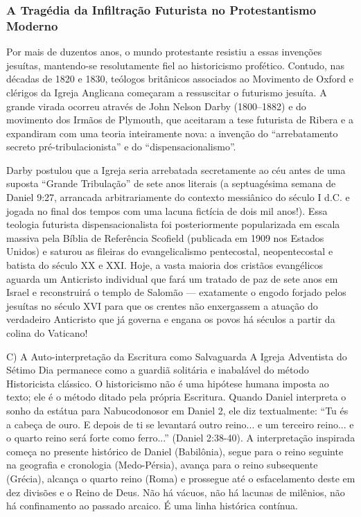 \subsubsection*{A Tragédia da Infiltração Futurista no Protestantismo Moderno}
Por mais de duzentos anos, o mundo protestante resistiu a essas invenções jesuítas, mantendo-se resolutamente fiel ao historicismo profético. Contudo, nas décadas de 1820 e 1830, teólogos britânicos associados ao Movimento de Oxford e clérigos da Igreja Anglicana começaram a ressuscitar o futurismo jesuíta. A grande virada ocorreu através de John Nelson Darby (1800–1882) e do movimento dos Irmãos de Plymouth, que aceitaram a tese futurista de Ribera e a expandiram com uma teoria inteiramente nova: a invenção do ``arrebatamento secreto pré-tribulacionista'' e do ``dispensacionalismo''.

Darby postulou que a Igreja seria arrebatada secretamente ao céu antes de uma suposta ``Grande Tribulação'' de sete anos literais (a septuagésima semana de Daniel 9:27, arrancada arbitrariamente do contexto messiânico do século I d.C. e jogada no final dos tempos com uma lacuna fictícia de dois mil anos!). Essa teologia futurista dispensacionalista foi posteriormente popularizada em escala massiva pela Bíblia de Referência Scofield (publicada em 1909 nos Estados Unidos) e saturou as fileiras do evangelicalismo pentecostal, neopentecostal e batista do século XX e XXI. Hoje, a vasta maioria dos cristãos evangélicos aguarda um Anticristo individual que fará um tratado de paz de sete anos em Israel e reconstruirá o templo de Salomão — exatamente o engodo forjado pelos jesuítas no século XVI para que os crentes não enxergassem a atuação do verdadeiro Anticristo que já governa e engana os povos há séculos a partir da colina do Vaticano!

C) A Auto-interpretação da Escritura como Salvaguarda
A Igreja Adventista do Sétimo Dia permanece como a guardiã solitária e inabalável do método Historicista clássico. O historicismo não é uma hipótese humana imposta ao texto; ele é o método ditado pela própria Escritura. Quando Daniel interpreta o sonho da estátua para Nabucodonosor em Daniel 2, ele diz textualmente: ``Tu és a cabeça de ouro. E depois de ti se levantará outro reino... e um terceiro reino... e o quarto reino será forte como ferro...'' (Daniel 2:38-40). A interpretação inspirada começa no presente histórico de Daniel (Babilônia), segue para o reino seguinte na geografia e cronologia (Medo-Pérsia), avança para o reino subsequente (Grécia), alcança o quarto reino (Roma) e prossegue até o esfacelamento deste em dez divisões e o Reino de Deus. Não há vácuos, não há lacunas de milênios, não há confinamento ao passado arcaico. É uma linha histórica contínua.



